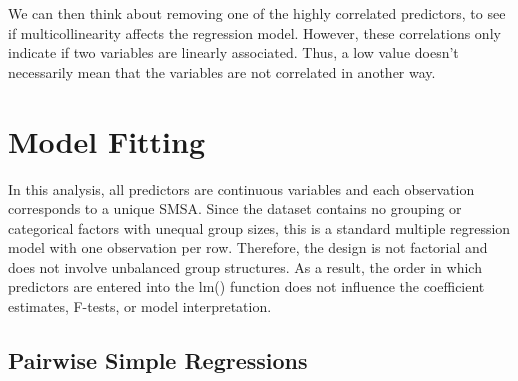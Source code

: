\documentclass[
  11pt,
]{article}
\begin{document}
We can then think about removing one of the highly correlated
predictors, to see if multicollinearity affects the regression model.
However, these correlations only indicate if two variables are linearly
associated. Thus, a low value doesn't necessarily mean that the
variables are not correlated in another way.

\section{Model Fitting}\label{model-fitting}

In this analysis, all predictors are continuous variables and each
observation corresponds to a unique SMSA. Since the dataset contains no
grouping or categorical factors with unequal group sizes, this is a
standard multiple regression model with one observation per row.
Therefore, the design is not factorial and does not involve unbalanced
group structures. As a result, the order in which predictors are entered
into the lm() function does not influence the coefficient estimates,
F-tests, or model interpretation.

\subsection{Pairwise Simple
Regressions}\label{pairwise-simple-regressions}
\end{document}
